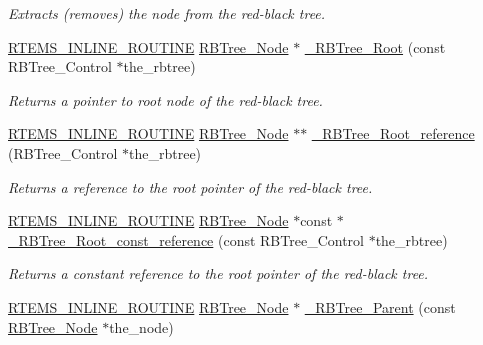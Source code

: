 \begin{DoxyCompactItemize}
\begin{DoxyCompactList}\small\item\em Extracts (removes) the node from the red-\/black tree. \end{DoxyCompactList}\item 
\mbox{\hyperlink{group__RTEMSScoreBaseDefs_gac216239df231d5dbd15e3520b0b9313f}{R\+T\+E\+M\+S\+\_\+\+I\+N\+L\+I\+N\+E\+\_\+\+R\+O\+U\+T\+I\+NE}} \mbox{\hyperlink{structRBTree__Node}{R\+B\+Tree\+\_\+\+Node}} $\ast$ \mbox{\hyperlink{group__RTEMSScoreRBTree_ga29242f056330aaabc12dcfcaa6f10a05}{\+\_\+\+R\+B\+Tree\+\_\+\+Root}} (const R\+B\+Tree\+\_\+\+Control $\ast$the\+\_\+rbtree)
\begin{DoxyCompactList}\small\item\em Returns a pointer to root node of the red-\/black tree. \end{DoxyCompactList}\item 
\mbox{\hyperlink{group__RTEMSScoreBaseDefs_gac216239df231d5dbd15e3520b0b9313f}{R\+T\+E\+M\+S\+\_\+\+I\+N\+L\+I\+N\+E\+\_\+\+R\+O\+U\+T\+I\+NE}} \mbox{\hyperlink{structRBTree__Node}{R\+B\+Tree\+\_\+\+Node}} $\ast$$\ast$ \mbox{\hyperlink{group__RTEMSScoreRBTree_ga195bd19595223fc96c4683fbb2f96460}{\+\_\+\+R\+B\+Tree\+\_\+\+Root\+\_\+reference}} (R\+B\+Tree\+\_\+\+Control $\ast$the\+\_\+rbtree)
\begin{DoxyCompactList}\small\item\em Returns a reference to the root pointer of the red-\/black tree. \end{DoxyCompactList}\item 
\mbox{\hyperlink{group__RTEMSScoreBaseDefs_gac216239df231d5dbd15e3520b0b9313f}{R\+T\+E\+M\+S\+\_\+\+I\+N\+L\+I\+N\+E\+\_\+\+R\+O\+U\+T\+I\+NE}} \mbox{\hyperlink{structRBTree__Node}{R\+B\+Tree\+\_\+\+Node}} $\ast$const  $\ast$ \mbox{\hyperlink{group__RTEMSScoreRBTree_ga78ee0ed3eaeca6a2a70372bbfe872f7b}{\+\_\+\+R\+B\+Tree\+\_\+\+Root\+\_\+const\+\_\+reference}} (const R\+B\+Tree\+\_\+\+Control $\ast$the\+\_\+rbtree)
\begin{DoxyCompactList}\small\item\em Returns a constant reference to the root pointer of the red-\/black tree. \end{DoxyCompactList}\item 
\mbox{\hyperlink{group__RTEMSScoreBaseDefs_gac216239df231d5dbd15e3520b0b9313f}{R\+T\+E\+M\+S\+\_\+\+I\+N\+L\+I\+N\+E\+\_\+\+R\+O\+U\+T\+I\+NE}} \mbox{\hyperlink{structRBTree__Node}{R\+B\+Tree\+\_\+\+Node}} $\ast$ \mbox{\hyperlink{group__RTEMSScoreRBTree_ga15c887d3c6f0fe578b8ddb8332ad3828}{\+\_\+\+R\+B\+Tree\+\_\+\+Parent}} (const \mbox{\hyperlink{structRBTree__Node}{R\+B\+Tree\+\_\+\+Node}} $\ast$the\+\_\+node)
$$
\end{DoxyCompactItemize}
